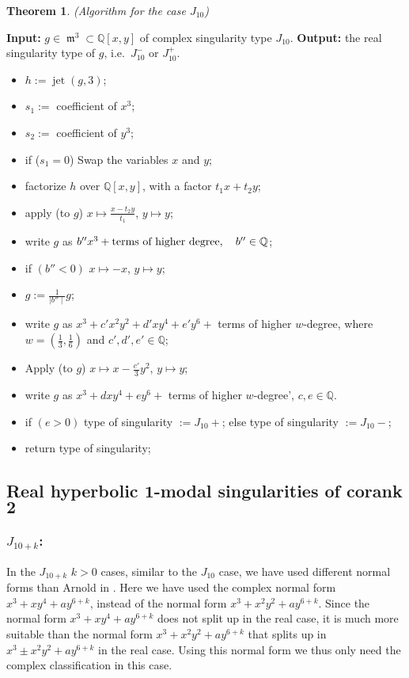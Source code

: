 \documentclass[noend]{amsproc}
\newtheorem{theorem}{Theorem}
\DeclareMathOperator{\m}{\mathfrak{m}}
\DeclareMathOperator{\jt}{jet}
\begin{document}
\begin{theorem}(Algorithm for the case $J_{10}$)
\end{theorem}
\noindent\textnormal{\bf Input:} $g\in \m^3\subset\mathbb Q[x,y]$ of complex
singularity type $J_{10}$.\newline
\textnormal{\bf Output:} the real singularity type of $g$, i.e.~$J_{10}^-$ or
$J_{10}^+$.
\begin{itemize}
\item $h:= \jt(g,3)$;
\item $s_1:=$ coefficient of $x^3$;
\item $s_2:=$ coefficient of $y^3$;
\item if ($s_1=0$)\newline
\phantom{}\quad\quad Swap the variables $x$ and $y$;
\item factorize $h$ over $\mathbb Q[x,y]$, with a factor $t_1x+t_2y$;
\item apply (to $g$) $x\mapsto\frac{x-t_2y}{t_1}$, $y\mapsto y$;
\item write $g$ as
$b''x^3+\textnormal{terms of higher degree},\quad b''\in\mathbb Q$;
\item if $(b'' <0)$\newline
\phantom{}\quad $x\mapsto -x$, $y\mapsto y$;
\item $g:= \frac{1}{\mid b''\mid} g$;
\item write $g$ as $x^3+c'x^2y^2+d'xy^4+e'y^6+$ terms of higher $w$-degree,
where $w=(\frac{1}{3},\frac{1}{6})$ and $c',d',e'\in\mathbb Q$;
\item Apply (to $g$) $x\mapsto x-\frac{c'}{3}y^2$, $y\mapsto y$;
\item write $g$ as $x^3+dxy^4+ey^6+$ terms of higher $w$-degree',\quad
$c,e\in\mathbb Q$.
\item if $(e>0)$\newline
\phantom{}\quad  type of singularity $:=J_{10}+$;\newline
\phantom{}else\newline
\phantom{}\quad type of singularity $:=J_{10}-$;
\item return type of singularity;
\end{itemize}

\subsection{Real hyperbolic $\mathbf 1$-modal singularities of corank $\mathbf 2$}
\subsubsection{$J_{10+k}$:}In the $J_{10+k}$ $k>0$ cases, similar to the $J_{10}$ case, we have used
different normal forms than Arnold in \cite{AVG1985}.
Here we have used the complex normal form $x^3+xy^4+a y^{6+k}$, instead of the
normal form $x^3+x^2y^2+ay^{6+k}$. Since the normal form $x^3+xy^4+a y^{6+k}$
does not split up in the real case, it is much more suitable than the normal
form $x^3+x^2y^2+ay^{6+k}$ that splits up in $x^3\pm x^2y^2+ay^{6+k}$ in the
real case. Using this normal form we thus only need the complex classification
in this case.
\end{document}
